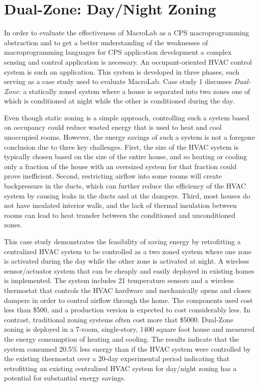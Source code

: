 \chapter{Dual-Zone: Day/Night Zoning}
\label{ch:cs1}

In order to evaluate the effectiveness of MacroLab as a CPS macroprogramming
abstraction and to get a better understanding of the weaknesses of
macroprogramming languages for CPS application development a complex sensing and
control application is necessary. An occupant-oriented HVAC control system is
such an application. This system is developed in three phases, each serving as a
case study used to evaluate MacroLab. Case study 1 discusses {\em Dual-Zone}: a
statically zoned system where a house is separated into two zones one of which
is conditioned at night while the other is conditioned during the day.

Even though static zoning is a simple approach, controlling such a system based
on occupancy could reduce wasted energy that is used to heat and cool unoccupied
rooms. However, the energy savings of such a system is not a foregone conclusion
due to three key challenges. First, the size of the HVAC system is typically
chosen based on the size of the entire house, and so heating or cooling only a
fraction of the house with an oversized system for that fraction could prove
inefficient. Second, restricting airflow into some rooms will create
backpressure in the ducts, which can further reduce the efficiency of the HVAC
system by causing leaks in the ducts and at the dampers. Third, most houses do
not have insulated interior walls, and the lack of thermal insulation between
rooms can lead to heat transfer between the conditioned and unconditioned zones.

This case study demonstrates the feasibility of saving energy by retrofitting a
centralized HVAC system to be controlled as a two zoned system where one zone is
activated during the day while the other zone is activated at night. A wireless
sensor/actuator system that can be cheaply and easily deployed in existing homes
is implemented. The system includes 21 temperature sensors and a wireless
thermostat that controls the HVAC hardware and mechanically opens and closes
dampers in order to control airflow through the home. The components used cost
less than \$500, and a production version is expected to cost considerably
less. In contrast, traditional zoning systems often cost more that
\$5000. Dual-Zone zoning is deployed in a 7-room, single-story, 1400 square foot
house and measured the energy consumption of heating and cooling. The results
indicate that the system consumed 20.5\% less energy than if the HVAC system
were controlled by the existing thermostat over a 20-day experimental period
indicating that retrofitting an existing centralized HVAC system for day/night
zoning has a potential for substantial energy savings.

